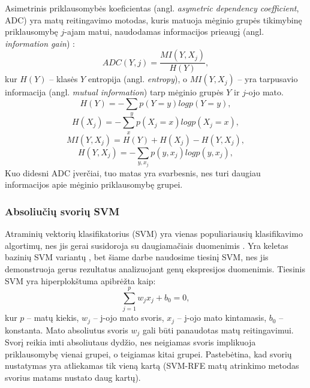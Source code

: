 Asimetrinis priklausomybės koeficientas (angl. \textit{asymetric dependency coefficient}, ADC) yra matų reitingavimo motodas, kuris matuoja mėginio grupės tikimybinę priklausomybę $j$-ajam matui, naudodamas informacijos prieaugį (angl. \textit{information gain}) \cite{kent1983information}:
\begin{equation}
 ADC(Y, j) = \frac{MI(Y, X_j)}{H(Y)},
\end{equation}
kur $H(Y)$ -- klasės $Y$ entropija (angl. \textit{entropy}), o $MI(Y, X_j)$ -- yra tarpusavio informacija \cite{Shannon:2001:MTC:584091.584093} (angl. \textit{mutual information}) tarp mėginio grupės $Y$ ir $j$-ojo mato.
\begin{equation}
 H(Y)=-\sum_y{p(Y=y)log{p(Y=y)}}, 
\end{equation}
\begin{equation}
 H(X_j)=-\sum_x{p(X_j=x) log{p(X_j=x)}},
\end{equation}
\begin{equation}
 MI(Y, X_j) = H(Y) + H(X_j) - H(Y, X_j),
\end{equation}
\begin{equation}
 H(Y, X_j) = -\sum_{y,x_j}{p(y, x_j)log{p(y, x_j)}},
\end{equation}
Kuo didesni ADC įverčiai, tuo matas yra svarbesnis, nes turi daugiau informacijos apie mėginio priklausomybę grupei.

\subsubsection{Absoliučių svorių SVM}

Atraminių vektorių klasifikatorius (SVM) yra vienas populiariausių klasifikavimo algortimų, nes jis gerai susidoroja su daugiamačiais duomenimis \cite{guyon2002gene}. Yra keletas bazinių SVM variantų \cite{vapnik2000nature}, bet šiame darbe naudosime tiesinį SVM, nes jis demonstruoja gerus rezultatus analizuojant genų ekspresijos duomenimis. Tiesinis SVM yra hiperplokštuma apibrėžta kaip:
\begin{equation}
 \sum_{j=1}^{p}{w_jx_j + b_0 = 0},
\end{equation}
kur $p$ -- matų kiekis, $w_j$ -- j-ojo mato svoris, $x_j$ -- j-ojo mato kintamasis, $b_0$ -- konstanta. Mato absoliutus svoris $w_j$ gali būti panaudotas
matų reitingavimui. Svorį reikia imti absoliutaus dydžio, nes neigiamas svoris implikuoja priklausomybę vienai grupei, o teigiamas kitai grupei. Pastebėtina, kad svorių nustatymas yra atliekamas tik vieną kartą (SVM-RFE matų atrinkimo metodas svorius matams nustato daug kartų).

